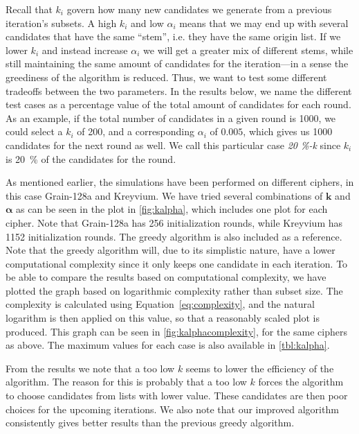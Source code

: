{Recall that $k_i$ govern how many new candidates we generate from a previous iteration's subsets. A high $k_i$ and low $\alpha_i$ means that we may end up with several candidates that have the same ``stem'', i.e. they have the same origin list. If we lower $k_i$ and instead increase $\alpha_i$ we will get a greater mix of different stems, while still maintaining the same amount of candidates for the iteration---in a sense the greediness of the algorithm is reduced. Thus, we want to test some different tradeoffs between the two parameters. In the results below, we name the different test cases as a percentage value of the total amount of candidates for each round. As an example, if the total number of candidates in a given round is 1000, we could select a $k_i$ of 200, and a corresponding $\alpha_i$ of $0.005$, which gives us 1000 candidates for the next round as well. We call this particular case \emph{20 \%-k} since $k_i$ is 20~\% of the candidates for the round.

As mentioned earlier, the simulations have been performed on different ciphers, in this case Grain-128a and Kreyvium.
We have tried several combinations of $\bm{k}$ and $\bm{\alpha}$ as can be seen in the plot in \autoref{fig:kalpha}, which includes one plot for each cipher. Note that Grain-128a has 256 initialization rounds, while Kreyvium has 1152 initialization rounds.
The greedy algorithm is also included as a reference. Note that the greedy algorithm will, due to its simplistic nature, have a lower computational complexity since it only keeps one candidate in each iteration. To be able to compare the results based on computational complexity, we have plotted the graph based on logarithmic complexity rather than subset size. The complexity is calculated using Equation~\ref{eq:complexity}, and the natural logarithm is then applied on this value, so that a reasonably scaled plot is produced. This graph can be seen in \autoref{fig:kalphacomplexity}, for the same ciphers as above. The maximum values for each case is also available in \autoref{tbl:kalpha}.

From the results we note that a too low $k$ seems to lower the efficiency of the algorithm. The reason for this is probably that a too low $k$ forces the algorithm to choose candidates from lists with lower value. These candidates are then poor choices for the upcoming iterations. We also note that our improved algorithm consistently gives better results than the previous greedy algorithm.

}
